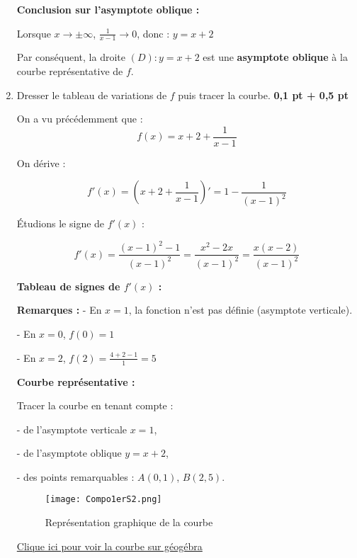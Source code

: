 \documentclass[12pt,a4paper]{article}
\begin{document}
\begin{enumerate}
\textbf{Conclusion sur l’asymptote oblique :}

Lorsque \( x \to \pm\infty \), \( \frac{1}{x - 1} \to 0 \), donc : $y = x + 2$

Par conséquent, la droite \( (D) : y = x + 2 \) est une \textbf{asymptote oblique} à la courbe représentative de \( f \).

    

\item Dresser le tableau de variations de \( f \) puis tracer la courbe. \hfill \textbf{0{,}1 pt + 0{,}5 pt}

On a vu précédemment que :
\[
f(x) = x + 2 + \frac{1}{x - 1}
\]

On dérive :

\[
f'(x) = \left(x + 2 + \frac{1}{x - 1}\right)' = 1 - \frac{1}{(x - 1)^2}
\]

Étudions le signe de \( f'(x) \) :

\[
f'(x) = \frac{(x - 1)^2 - 1}{(x - 1)^2} = \frac{x^2 - 2x}{(x - 1)^2} = \frac{x(x - 2)}{(x - 1)^2}
\]

\textbf{Tableau de signes de \( f'(x) \) :}

\begin{center}
\end{center}

\textbf{Remarques :}
- En \( x = 1 \), la fonction n'est pas définie (asymptote verticale).

- En \( x = 0 \), \( f(0) = 1 \)

- En \( x = 2 \), \( f(2) = \frac{4 + 2 - 1}{1} = 5 \)

\medskip

\textbf{Courbe représentative :}

Tracer la courbe en tenant compte :

- de l’asymptote verticale \( x = 1 \),

- de l’asymptote oblique \( y = x + 2 \),

- des points remarquables : \( A(0,1) \), \( B(2,5) \).

\begin{center}
\begin{figure}[H]%
\centering
\texttt{[image: Compo1erS2.png]}
\caption{Représentation graphique de la courbe}
\label{fig:monimage}
\end{figure}
\href{https://www.geogebra.org/classic/rduxvtyf}{Clique ici pour voir la courbe sur géogébra}\\
\end{center}

\end{enumerate}
\end{document}
